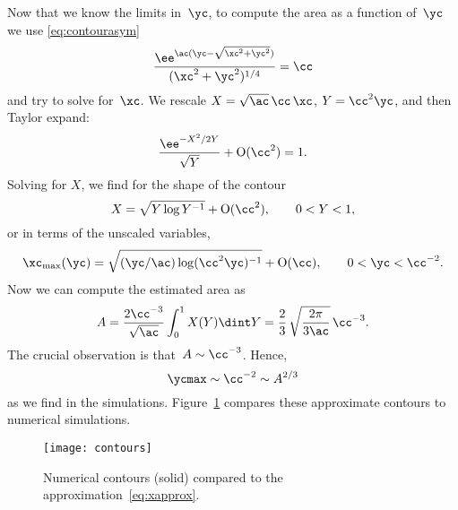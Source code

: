 \documentclass[notitlepage,12pt]{article}
\newcommand{\Order}[1]{\mathrm{O}(#1)}      %
\begin{document}
Now that we know the limits in~$\yc$, to compute the area as a function
of~$\yc$ we use \cref{eq:contourasym} 
\begin{equation}
  \frac{\ee^{\ac(\yc - \sqrt{\xc^2 + \yc^2})}}{(\xc^2 + \yc^2)^{1/4}} = \cc
  \label{eq:contourasymxy}
\end{equation}
and try to solve for~$\xc$.  We rescale $X = \sqrt{\ac}\,\cc\,\xc$,
$Y = \cc^2\yc$, and then Taylor expand:
\begin{equation}
  \frac{\ee^{-X^2/2Y}}{\sqrt{Y}} + \Order{\cc^2} = 1.
\end{equation}
Solving for $X$, we find for the shape of the contour
\begin{equation}
  X = \sqrt{Y\log Y^{-1}} + \Order{\cc^2},
  \qquad
  0 < Y < 1,
\end{equation}
or in terms of the unscaled variables,
\begin{equation}
  \xc_{\mathrm{max}}(\yc) = \sqrt{(\yc/\ac)\log(\cc^2\yc)^{-1}}
  + \Order{\cc},
  \qquad
  0 < \yc < \cc^{-2}.
  \label{eq:xapprox}
\end{equation}
Now we can compute the estimated area as
\begin{equation}
  A
  =
  \frac{2\cc^{-3}}{\sqrt\ac}\int_0^1 X(Y)\dint Y
  =
  \frac{2}{3}\,\sqrt{\frac{2\pi}{3\ac}}\,\cc^{-3}.
  \label{eq:A}
\end{equation}
The crucial observation is that~$A \sim \cc^{-3}$.  Hence,
\begin{equation}
  \ycmax \sim \cc^{-2} \sim A^{2/3}
\end{equation}
as we find in the simulations.  Figure~\ref{fig:contours} compares these
approximate contours to numerical simulations.

\begin{figure}
  \begin{center}
    \texttt{[image: contours]}
  \end{center}
  \caption{Numerical contours (solid) compared to the
    approximation~\eqref{eq:xapprox}.}
  \label{fig:contours}
\end{figure}
\end{document}
